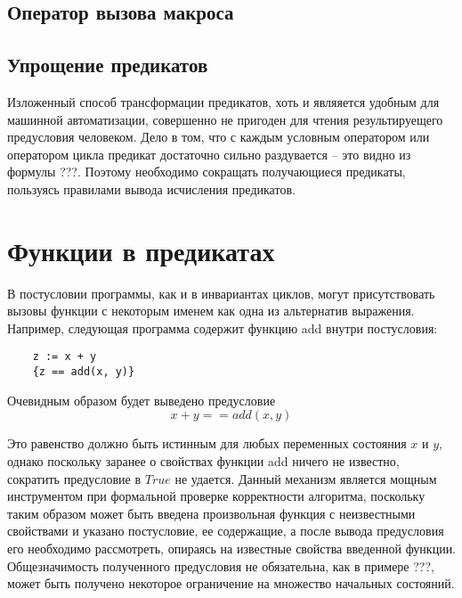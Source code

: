 \subsection{Оператор вызова макроса}

\subsection{Упрощение предикатов}
Изложенный способ трансформации предикатов, хоть и являяется удобным для машинной автоматизации,
совершенно не пригоден для чтения результируещего предусловия человеком. Дело в том, что с каждым условным оператором
или оператором цикла предикат достаточно сильно раздувается -- это видно из формулы ???. Поэтому необходимо
сокращать получающиеся предикаты, пользуясь правилами вывода исчисления предикатов.

\section{Функции в предикатах}
В постусловии программы, как и в инвариантах циклов, могут присутствовать вызовы функции с некоторым именем как
одна из альтернатив выражения. Например, следующая программа содержит функцию add внутри постусловия:
\begin{verbatim}
    z := x + y
    {z == add(x, y)}
\end{verbatim}

Очевидным образом будет выведено предусловие 
\begin{equation}
    x + y == add(x, y)
\end{equation}

Это равенство должно быть истинным для любых переменных состояния $x$ и $y$, однако поскольку заранее о свойствах функции
add ничего не известно, сократить предусловие в $True$ не удается. Данный механизм является мощным инструментом при 
формальной проверке корректности алгоритма, поскольку таким образом может быть введена произвольная функция
с неизвестными свойствами и указано постусловие, ее содержащие, а после вывода предусловия его необходимо рассмотреть,
опираясь на известные свойства введенной функции. Общезначимость полученного предусловия не обязательна, как в примере ???,
может быть получено некоторое ограничение на множество начальных состояний.

